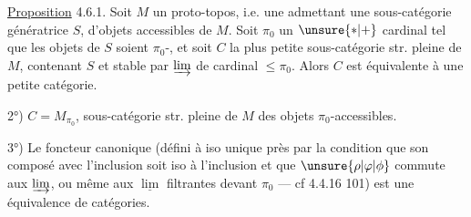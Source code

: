 \uline{Proposition} 4.6.1. Soit $M$ un proto-topos, i.e. une   admettant une  sous-catégorie  génératrice $S$,  d'objets accessibles de $M$. Soit $\pi_0$ un $\unsure{*|+}$ cardinal tel que les objets de $S$ soient $\pi_0$-,   et soit $C$ la plus petite sous-catégorie str. pleine de $M$, contenant  $S$ et stable par $\varinjlim$ de cardinal $\leq\pi_0$. Alors
 $C$ est équivalente à une petite catégorie.

2°) $C=M_{\pi_0}$, sous-catégorie  str. pleine de $M$  des objets $\pi_0$-accessibles.

3°) Le foncteur canonique
(défini à iso  unique près par la condition que son composé avec l'inclusion
soit iso à l'inclusion
et que $\unsure{\rho|\varphi|\phi}$ commute aux  $\varinjlim$, ou même aux  $\underline{\lim}$ filtrantes   devant $\pi_0$ --- cf 4.4.16  101)  est une équivalence de catégories.

